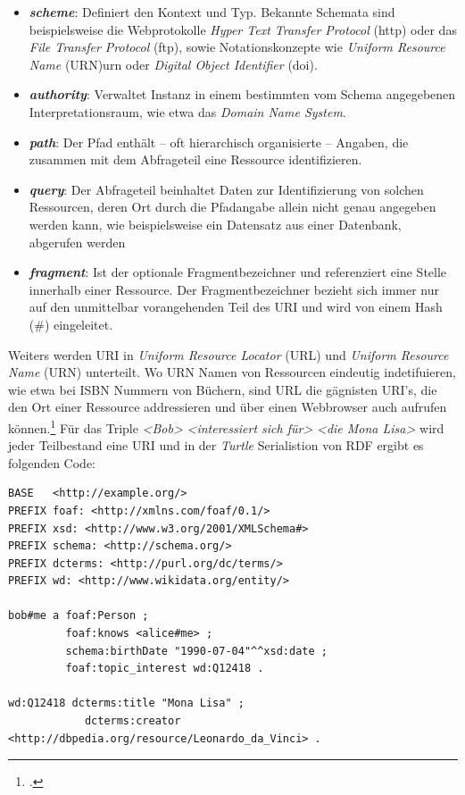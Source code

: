\documentclass[12pt,a4paper]{article}
\begin{document}
\begin{itemize}
\item \textbf{\textit{scheme}}: Definiert den Kontext und Typ. Bekannte Schemata sind beispielsweise die Webprotokolle \textit{Hyper Text Transfer Protocol} (http) oder das \textit{File Transfer Protocol} (ftp), sowie Notationskonzepte wie \textit{Uniform Resource Name} (URN)urn oder \textit{Digital Object Identifier} (doi).
\item \textbf{\textit{authority}}: Verwaltet Instanz in einem bestimmten vom Schema angegebenen Interpretationsraum, wie etwa das \textit{Domain Name System}.
\item \textbf{\textit{path}}: Der Pfad enthält – oft hierarchisch organisierte – Angaben, die zusammen mit dem Abfrageteil eine Ressource identifizieren. 
\item \textbf{\textit{query}}: Der Abfrageteil beinhaltet Daten zur Identifizierung von solchen Ressourcen, deren Ort durch die Pfadangabe allein nicht genau angegeben werden kann, wie beispielsweise ein Datensatz aus einer Datenbank, abgerufen werden
\item \textbf{\textit{fragment}}: Ist der optionale Fragmentbezeichner und referenziert eine Stelle innerhalb einer Ressource. Der Fragmentbezeichner bezieht sich immer nur auf den unmittelbar vorangehenden Teil des URI und wird von einem Hash (\#) eingeleitet.
\end{itemize}

Weiters werden URI in \textit{Uniform Resource Locator} (URL) und \textit{Uniform Resource Name} (URN) unterteilt. Wo URN Namen von Ressourcen eindeutig indetifuieren, wie etwa bei ISBN Nummern von Büchern, sind URL die gägnisten URI's, die den Ort einer Ressource addressieren und über einen Webbrowser auch aufrufen können.\footcite[Vgl.][S.21-22]{powers2003practical} Für das Triple \textit{<Bob>} \textit{<interessiert sich für>} \textit{<die Mona Lisa>} wird jeder Teilbestand eine URI und in der \textit{Turtle} Serialistion von RDF ergibt es folgenden Code:
\begin{lstlisting}[]
BASE   <http://example.org/>
PREFIX foaf: <http://xmlns.com/foaf/0.1/>
PREFIX xsd: <http://www.w3.org/2001/XMLSchema#>
PREFIX schema: <http://schema.org/>
PREFIX dcterms: <http://purl.org/dc/terms/>
PREFIX wd: <http://www.wikidata.org/entity/>

bob#me a foaf:Person ;
         foaf:knows <alice#me> ;
         schema:birthDate "1990-07-04"^^xsd:date ;
         foaf:topic_interest wd:Q12418 .
 
wd:Q12418 dcterms:title "Mona Lisa" ;
            dcterms:creator <http://dbpedia.org/resource/Leonardo_da_Vinci> .
\end{lstlisting}
\end{document}
